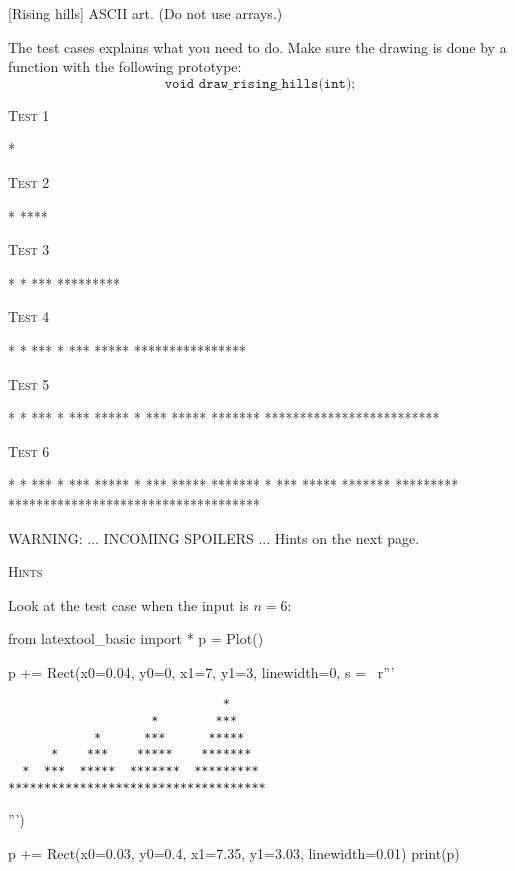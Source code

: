 [Rising hills]
ASCII art.
(Do not use arrays.)

The test cases explains what you need to do.
Make sure the drawing is done by a function with the following prototype:
\[
\texttt{void draw\_rising\_hills(int);}
\]

\textsc{Test 1}
\begin{console}[commandchars=\\\{\}]
*
\end{console}

\textsc{Test 2}
\begin{console}[commandchars=\\\{\}]
  *
****
\end{console}

\textsc{Test 3}
\begin{console}[commandchars=\\\{\}]
      *
  *  ***
*********
\end{console}

\textsc{Test 4}
\begin{console}[commandchars=\\\{\}]
            *
      *    ***
  *  ***  *****
****************
\end{console}

\textsc{Test 5}
\begin{console}[commandchars=\\\{\}]
                    *
            *      ***
      *    ***    *****
  *  ***  *****  *******
*************************
\end{console}

\textsc{Test 6}
\begin{console}[commandchars=\\\{\}]
                              *     
                    *        ***    
            *      ***      *****   
      *    ***    *****    *******  
  *  ***  *****  *******  ********* 
************************************
\end{console}


WARNING: ... INCOMING SPOILERS ...
Hints on the next page.

\newpage
\textsc{Hints}

Look at the test case when the input is $n = 6$:

\begin{python}
from latextool_basic import *
p = Plot()

p += Rect(x0=0.04, y0=0, x1=7, y1=3, linewidth=0, s = \
r'''\begin{Verbatim}
                              *     
                    *        ***    
            *      ***      *****   
      *    ***    *****    *******  
  *  ***  *****  *******  ********* 
************************************
\end{Verbatim}''')

p += Rect(x0=0.03, y0=0.4, x1=7.35, y1=3.03, linewidth=0.01)
print(p)
\end{python}

